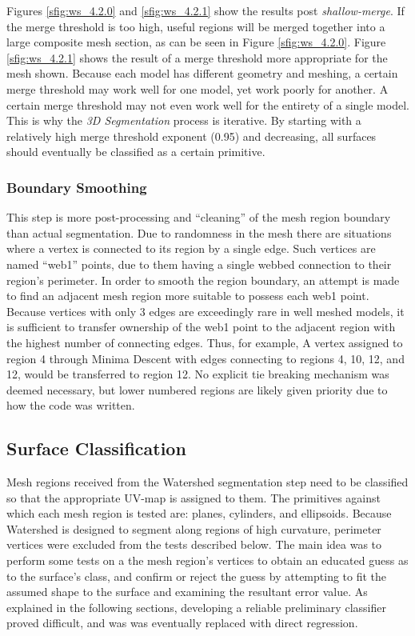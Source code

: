 Figures \ref{sfig:ws_4.2.0} and \ref{sfig:ws_4.2.1} show the results post \textit{shallow-merge}.
If the merge threshold is too high, useful regions will be merged together into a large composite mesh section, as can be seen in Figure \ref{sfig:ws_4.2.0}.
Figure \ref{sfig:ws_4.2.1} shows the result of a merge threshold more appropriate for the mesh shown.
Because each model has different geometry and meshing, a certain merge threshold may work well for one model, yet work poorly for another.
A certain merge threshold may not even work well for the entirety of a single model.
This is why the \textit{3D Segmentation} process is iterative.
By starting with a relatively high merge threshold exponent (0.95) and decreasing, all surfaces should eventually be classified as a certain primitive.

\subsubsection{Boundary Smoothing}
This step is more post-processing and ``cleaning'' of the mesh region boundary than actual segmentation.
Due to randomness in the mesh there are situations where a vertex is connected to its region by a single edge.
Such vertices are named ``web1'' points, due to them having a single webbed connection to their region's perimeter.
In order to smooth the region boundary, an attempt is made to find an adjacent mesh region more suitable to possess each web1 point.
Because vertices with only 3 edges are exceedingly rare in well meshed models, it is sufficient to transfer ownership of the web1 point to the adjacent region with the highest number of connecting edges.
Thus, for example, A vertex assigned to region 4 through Minima Descent with edges connecting to regions 4, 10, 12, and 12, would be transferred to region 12.
No explicit tie breaking mechanism was deemed necessary, but lower numbered regions are likely given priority due to how the code was written.


\subsection{Surface Classification}
Mesh regions received from the Watershed segmentation step need to be classified so that the appropriate UV-map is assigned to them.
The primitives against which each mesh region is tested are: planes, cylinders, and ellipsoids.
Because Watershed is designed to segment along regions of high curvature, perimeter vertices were excluded from the tests described below.
The main idea was to perform some tests on a the mesh region's vertices to obtain an educated guess as to the surface's class, and confirm or reject the guess by attempting to fit the assumed shape to the surface and examining the resultant error value.
As explained in the following sections, developing a reliable preliminary classifier proved difficult, and was was eventually replaced with direct regression.

